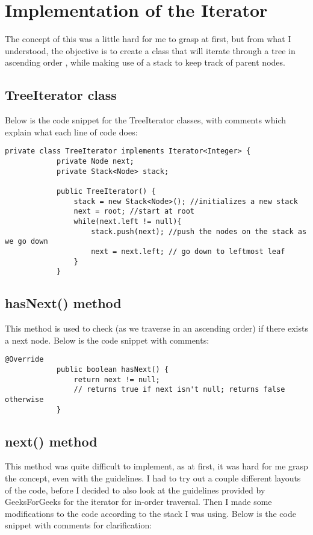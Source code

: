 \documentclass[a4paper,11pt]{article}
\begin{document}
\section*{Implementation of the Iterator}

The concept of this was a little hard for me to grasp at first, but from what I understood, the objective is to create a class that will iterate through a tree in ascending order , while making use of a stack to keep track of parent nodes. 
 
\subsection*{TreeIterator class}
Below is the code snippet for the TreeIterator classes, with comments which explain what each line of code does:

\begin{verbatim}
private class TreeIterator implements Iterator<Integer> {
            private Node next;
            private Stack<Node> stack;
            
            public TreeIterator() {
                stack = new Stack<Node>(); //initializes a new stack
                next = root; //start at root
                while(next.left != null){
                    stack.push(next); //push the nodes on the stack as we go down
                    next = next.left; // go down to leftmost leaf
                }
            }
\end{verbatim}

\subsection*{hasNext() method}
This method is used to check  (as we traverse in an ascending order) if there exists a next node. Below is the code snippet with comments:

\begin{verbatim}
@Override
            public boolean hasNext() {
                return next != null; 
                // returns true if next isn't null; returns false otherwise
            }
 \end{verbatim}


\subsection*{next() method}

This method was quite difficult to implement, as at first, it was hard for me grasp the concept, even with the guidelines. I had to try out a couple different layouts of the code, before I decided to also look at the guidelines provided by GeeksForGeeks for the iterator for in-order traversal. Then I made some modifications to the code according to the stack I was using. Below is the code snippet with comments for clarification:
\end{document}
